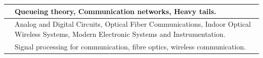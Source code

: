 \documentclass[openany]{book} %
\begin{document}
\begin{tabular}{p{4.5cm} p{9cm}}
\href{https://www.ee.iitb.ac.in/~jayakrishnan.nair/}{\color{blue}{Prof. Jaykrishnan U. Nair }} & Queueing theory, Communication networks, Heavy tails. \\ 
\hline

\href{https://www.ee.iitb.ac.in/wiki/faculty/jjohn}{\color{blue}{Prof. Joseph John}} & Analog and Digital Circuits, Optical Fiber Communications, Indoor Optical Wireless Systems, Modern Electronic Systems and Instrumentation. \\ 
\hline 

\href{https://www.ee.iitb.ac.in/~akumar/}{\color{blue}{Prof. Kumar Appaiah}} & Signal processing for communication, fibre optics, wireless communication. \\ 
\hline 

\end{tabular} 
\end{document}
